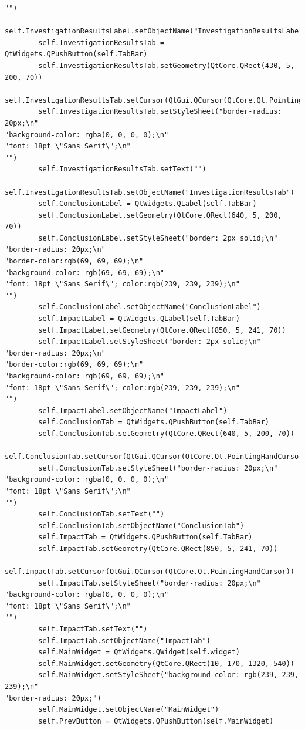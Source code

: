 \documentclass{article}
\begin{document}
\begin{lstlisting}
"")
        self.InvestigationResultsLabel.setObjectName("InvestigationResultsLabel")
        self.InvestigationResultsTab = QtWidgets.QPushButton(self.TabBar)
        self.InvestigationResultsTab.setGeometry(QtCore.QRect(430, 5, 200, 70))
        self.InvestigationResultsTab.setCursor(QtGui.QCursor(QtCore.Qt.PointingHandCursor))
        self.InvestigationResultsTab.setStyleSheet("border-radius: 20px;\n"
"background-color: rgba(0, 0, 0, 0);\n"
"font: 18pt \"Sans Serif\";\n"
"")
        self.InvestigationResultsTab.setText("")
        self.InvestigationResultsTab.setObjectName("InvestigationResultsTab")
        self.ConclusionLabel = QtWidgets.QLabel(self.TabBar)
        self.ConclusionLabel.setGeometry(QtCore.QRect(640, 5, 200, 70))
        self.ConclusionLabel.setStyleSheet("border: 2px solid;\n"
"border-radius: 20px;\n"
"border-color:rgb(69, 69, 69);\n"
"background-color: rgb(69, 69, 69);\n"
"font: 18pt \"Sans Serif\"; color:rgb(239, 239, 239);\n"
"")
        self.ConclusionLabel.setObjectName("ConclusionLabel")
        self.ImpactLabel = QtWidgets.QLabel(self.TabBar)
        self.ImpactLabel.setGeometry(QtCore.QRect(850, 5, 241, 70))
        self.ImpactLabel.setStyleSheet("border: 2px solid;\n"
"border-radius: 20px;\n"
"border-color:rgb(69, 69, 69);\n"
"background-color: rgb(69, 69, 69);\n"
"font: 18pt \"Sans Serif\"; color:rgb(239, 239, 239);\n"
"")
        self.ImpactLabel.setObjectName("ImpactLabel")
        self.ConclusionTab = QtWidgets.QPushButton(self.TabBar)
        self.ConclusionTab.setGeometry(QtCore.QRect(640, 5, 200, 70))
        self.ConclusionTab.setCursor(QtGui.QCursor(QtCore.Qt.PointingHandCursor))
        self.ConclusionTab.setStyleSheet("border-radius: 20px;\n"
"background-color: rgba(0, 0, 0, 0);\n"
"font: 18pt \"Sans Serif\";\n"
"")
        self.ConclusionTab.setText("")
        self.ConclusionTab.setObjectName("ConclusionTab")
        self.ImpactTab = QtWidgets.QPushButton(self.TabBar)
        self.ImpactTab.setGeometry(QtCore.QRect(850, 5, 241, 70))
        self.ImpactTab.setCursor(QtGui.QCursor(QtCore.Qt.PointingHandCursor))
        self.ImpactTab.setStyleSheet("border-radius: 20px;\n"
"background-color: rgba(0, 0, 0, 0);\n"
"font: 18pt \"Sans Serif\";\n"
"")
        self.ImpactTab.setText("")
        self.ImpactTab.setObjectName("ImpactTab")
        self.MainWidget = QtWidgets.QWidget(self.widget)
        self.MainWidget.setGeometry(QtCore.QRect(10, 170, 1320, 540))
        self.MainWidget.setStyleSheet("background-color: rgb(239, 239, 239);\n"
"border-radius: 20px;")
        self.MainWidget.setObjectName("MainWidget")
        self.PrevButton = QtWidgets.QPushButton(self.MainWidget)

\end{lstlisting}
\end{document}
